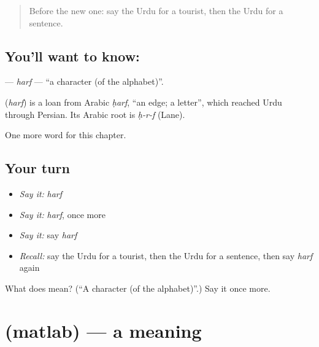 \label{lesson:UR-C171-harf}



\begin{quote}
Before the new one: say the Urdu for a tourist, then the Urdu for a sentence.
\end{quote}

\subsection*{You'll want to know: }
\textbf{} — \emph{harf} — \textquotedblleft{}a character (of the alphabet)\textquotedblright{}.

\begin{cousinweb}
\textbf{} (\emph{harf}) is a loan from Arabic \emph{ḥarf}, \textquotedblleft{}an edge; a letter\textquotedblright{}, which reached Urdu through Persian. Its Arabic root is \emph{ḥ-r-f} (Lane).
\end{cousinweb}

\begin{grammarlens}[title={What you've built}]
One more word for this chapter.
\end{grammarlens}

\subsection*{Your turn}
\begin{itemize}
\raggedright
  \item \emph{Say it:} \emph{harf}
  \item \emph{Say it:} \emph{harf}, once more
  \item \emph{Say it:} say \emph{harf}
  \item \emph{Recall:} say the Urdu for a tourist, then the Urdu for a sentence, then say \emph{harf} again
\end{itemize}

\begin{tcolorbox}[breakable,colback=teal!4,colframe=teal!35!black,title={Before you move on}]
What does  mean? (\textquotedblleft{}A character (of the alphabet)\textquotedblright{}.) Say it once more.
\end{tcolorbox}
\section[\texorpdfstring{\ur{مطلب} (matlab)}{مطلب (matlab)}]{ (matlab) — a meaning}

\label{lesson:UR-C171-matlab}



